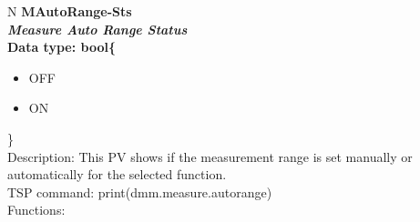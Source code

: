 \documentclass[openany]{article}
\begin{document}
		\begin{tabular}{N}
			\hline
			\bfseries MAutoRange-Sts\label{pv:mautorange-sts} \\ \hline
			\emph{Measure Auto Range Status} \\
			Data type: bool\{\begin{itemize}[noitemsep]
				\small
				\item[] OFF
				\item[] ON
			\end{itemize}\} \\
			Description: This PV shows if the measurement range is set manually or automatically for the selected function.\\
			TSP command: print(dmm.measure.autorange) \\
			Functions: \\
			\arrayrulecolor{\FuncTableBorderColor}

		\end{tabular}
\end{document}

